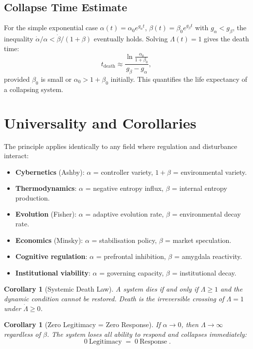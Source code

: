 \documentclass[11pt]{article}
\newtheorem{corollary}[theorem]{Corollary}
\begin{document}
\subsection{Collapse Time Estimate}
For the simple exponential case \(\alpha(t)=\alpha_0 e^{g_\alpha t}\), \(\beta(t)=\beta_0 e^{g_\beta t}\) with \(g_\alpha < g_\beta\), the inequality \(\dot\alpha/\alpha < \dot\beta/(1+\beta)\) eventually holds.
Solving \(\Lambda(t)=1\) gives the death time:
\begin{equation}
t_{\text{death}} \approx \frac{\ln\frac{\alpha_0}{1+\beta_0}}{g_\beta - g_\alpha},
\end{equation}
provided \(\beta_0\) is small or \(\alpha_0>1+\beta_0\) initially. This quantifies the life expectancy of a collapsing system.

\section{Universality and Corollaries}
\label{sec:universal}
The principle applies identically to any field where regulation and disturbance interact:

\begin{itemize}[leftmargin=2em]
    \item \textbf{Cybernetics} (Ashby): \(\alpha\) = controller variety, \(1+\beta\) = environmental variety.
    \item \textbf{Thermodynamics}: \(\alpha\) = negative entropy influx, \(\beta\) = internal entropy production.
    \item \textbf{Evolution} (Fisher): \(\alpha\) = adaptive evolution rate, \(\beta\) = environmental decay rate.
    \item \textbf{Economics} (Minsky): \(\alpha\) = stabilisation policy, \(\beta\) = market speculation.
    \item \textbf{Cognitive regulation}: \(\alpha\) = prefrontal inhibition, \(\beta\) = amygdala reactivity.
    \item \textbf{Institutional viability}: \(\alpha\) = governing capacity, \(\beta\) = institutional decay.
\end{itemize}

\begin{corollary}[Systemic Death Law]
A system dies if and only if \(\Lambda \ge 1\) and the dynamic condition cannot be restored. Death is the irreversible crossing of \(\Lambda=1\) under \(\dot\Lambda \ge 0\).
\end{corollary}

\begin{corollary}[Zero Legitimacy = Zero Response]
If \(\alpha \to 0\), then \(\Lambda \to \infty\) regardless of \(\beta\). The system loses all ability to respond and collapses immediately:
\[
\boxed{\;0\ \text{Legitimacy} \;=\; 0\ \text{Response}\;}.
\]
\end{corollary}
\end{document}
